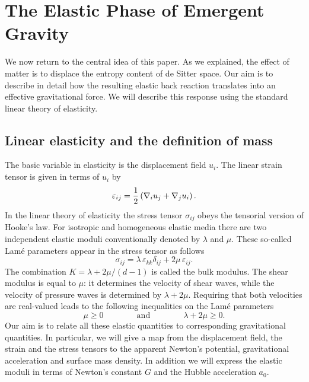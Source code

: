 \documentclass[a4paper,12pt]{article}
\newcommand{\be}{\begin{equation}}
\newcommand{\ee}{\end{equation}}
\begin{document}
\vspace{1cm}

\section{The Elastic Phase of Emergent Gravity}
\setcounter{equation}{0}  
  
We now return to the central idea of this paper. As we explained, the effect of matter is to displace the entropy content of de Sitter space. Our aim is to describe in detail how the resulting elastic back reaction translates into an effective gravitational force. We will describe this response using the standard linear theory of elasticity.

\subsection{Linear elasticity and the definition of mass}

The basic variable in elasticity is the displacement field $u_i$. The linear strain tensor is given in terms of $u_i$ by
\be
\label{straindef}
\varepsilon_{ij} ={1\over 2}\left(\nabla_i u_j+ \nabla_j u_i\right). %
\ee
In the linear theory of elasticity the stress tensor $\sigma_{ij}$ obeys the tensorial version of Hooke's law. For isotropic and 
homogeneous elastic media there are two independent elastic moduli conventionally denoted by  $\lambda$ and $\mu$.    These so-called Lam\'{e} parameters appear in the stress tensor as follows
 \be
 \label{stress}
\sigma_{ij}= \lambda\, \varepsilon_{kk} \delta_{ij} + 2\mu\, \varepsilon_{ij} . %
 \ee 
The combination $K=\lambda + 2\mu/(d-1) $ is called the bulk modulus. The shear modulus is equal to $\mu$: it determines the velocity of shear waves, while the velocity of pressure waves is determined by $\lambda + 2\mu$.   Requiring that both velocities are real-valued leads to the following inequalities on the Lam\'e parameters 
\be
\mu \geq 0 \qquad \qquad \mbox{and}\qquad \qquad \lambda +2\mu\geq 0.
\ee
Our aim is to relate all these elastic quantities to corresponding gravitational quantities.  In particular, we will give a map from the displacement field, the strain and the stress tensors to the apparent  Newton's potential, gravitational acceleration and surface mass density. In addition we will express  the elastic moduli in terms of Newton's constant $G$ and the Hubble acceleration $a_0$.
\end{document}
